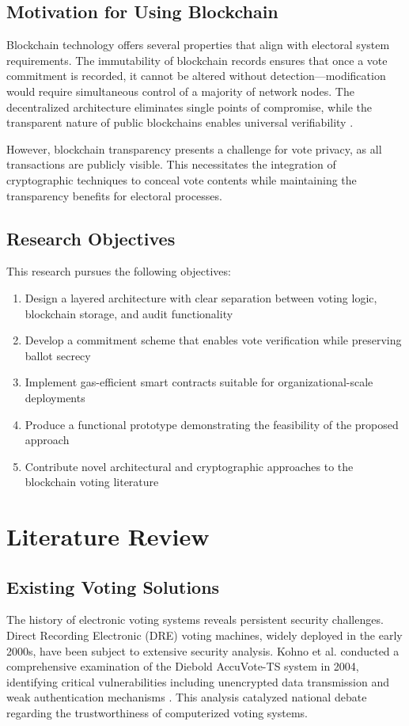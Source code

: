 \documentclass[conference]{IEEEtran}
\begin{document}
\subsection{Motivation for Using Blockchain}
Blockchain technology offers several properties that align with electoral system requirements. The immutability of blockchain records ensures that once a vote commitment is recorded, it cannot be altered without detection---modification would require simultaneous control of a majority of network nodes. The decentralized architecture eliminates single points of compromise, while the transparent nature of public blockchains enables universal verifiability \cite{ethereum_voting}.

However, blockchain transparency presents a challenge for vote privacy, as all transactions are publicly visible. This necessitates the integration of cryptographic techniques to conceal vote contents while maintaining the transparency benefits for electoral processes.

\subsection{Research Objectives}
This research pursues the following objectives:
\begin{enumerate}
    \item Design a layered architecture with clear separation between voting logic, blockchain storage, and audit functionality
    \item Develop a commitment scheme that enables vote verification while preserving ballot secrecy
    \item Implement gas-efficient smart contracts suitable for organizational-scale deployments
    \item Produce a functional prototype demonstrating the feasibility of the proposed approach
    \item Contribute novel architectural and cryptographic approaches to the blockchain voting literature
\end{enumerate}

\section{Literature Review}

\subsection{Existing Voting Solutions}
The history of electronic voting systems reveals persistent security challenges. Direct Recording Electronic (DRE) voting machines, widely deployed in the early 2000s, have been subject to extensive security analysis. Kohno et al. conducted a comprehensive examination of the Diebold AccuVote-TS system in 2004, identifying critical vulnerabilities including unencrypted data transmission and weak authentication mechanisms \cite{dre_issues}. This analysis catalyzed national debate regarding the trustworthiness of computerized voting systems.
\end{document}
